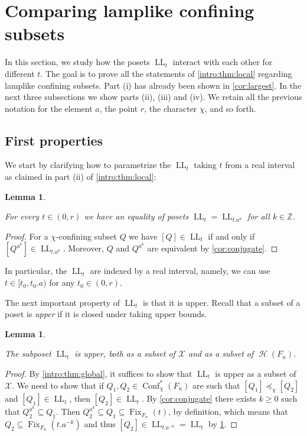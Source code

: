 \documentclass[reqno,12pt]{amsart}\setcounter{tocdepth}{1}
\newtheorem{lemma}[theorem]{Lemma}
\theoremstyle{definition}
\newcommand{\Z}{\mathbb{Z}}
\DeclareMathOperator{\Fix}{Fix}
\DeclareMathOperator{\Hyp}{\mathcal{H}}
\DeclareMathOperator{\Conf}{Conf}
\DeclareMathOperator{\LL}{LL}
\newcommand{\X}{\mathcal{X}}
\numberwithin{equation}{section}
\begin{document}
\section{Comparing lamplike confining subsets}\label{sec:lamplike:plural}

In this section, we study how the posets $\LL_t$ interact with each other for different $t$. The goal is to prove all the statements of \cref{intro:thm:local} regarding lamplike confining subsets. Part (i) has already been shown in \cref{cor:largest}. In the next three subsections we show parts (ii), (iii) and (iv). We retain all the previous notation for the element $a$, the point $r$, the character $\chi$, and so forth.


\subsection{First properties}

We start by clarifying how to parametrize the $\LL_t$ taking $t$ from a real interval as claimed in part (ii) of \cref{intro:thm:local}:

\begin{lemma}
\label{lem:LLt:equality}

For every $t \in (0, r)$ we have an equality of posets $\LL_t = \LL_{t.a^k}$ for all $k \in \Z$.
\end{lemma}

\begin{proof}
For a $\chi$-confining subset $Q$ we have $[Q] \in \LL_t$ if and only if $[Q^{a^k}] \in \LL_{t.a^k}$. Moreover, $Q$ and $Q^{a^k}$ are equivalent by \cref{cor:conjugate}.
\end{proof}

In particular, the $\LL_t$ are indexed by a real interval, namely, we can use $t\in [t_0,t_0.a)$ for any $t_0\in (0,r)$.

The next important property of $\LL_t$ is that it is upper. Recall that a subset of a poset is \emph{upper} if it is closed under taking upper bounds.

\begin{lemma}
\label{lem:LLt:upper}

The subposet $\LL_t$ is upper, both as a subset of $\X$ and as a subset of $\Hyp(F_n)$.
\end{lemma}

\begin{proof}
By \cref{intro:thm:global}, it suffices to show that $\LL_t$ is upper as a subset of $\X$. We need to show that if $Q_1, Q_2 \in \Conf^\ast_\chi(F_n)$ are such that $[Q_1] \preccurlyeq_\chi [Q_2]$ and $[Q_1] \in \LL_t$, then $[Q_2] \in \LL_t$. By \cref{cor:conjugate} there exists $k \geq 0$ such that $Q_2^{a^k} \subseteq Q_1$. Then $Q_2^{a^k} \subseteq Q_1 \subseteq \Fix_{F_n}(t)$, by definition, which means that $Q_2 \subseteq \Fix_{F_n}(t.a^{-k})$ and thus $[Q_2] \in \LL_{t.a^{-k}} = \LL_t$ by \cref{lem:LLt:equality}.
\end{proof}
\end{document}
